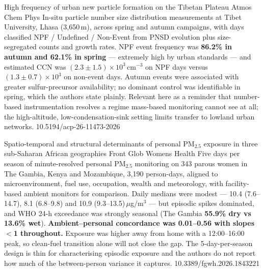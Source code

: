 \documentclass[10pt]{article}
\begin{document}
{High frequency of urban new particle formation on the Tibetan Plateau}
{Atmos Chem Phys}
{In-situ particle number size distribution measurements at Tibet University, Lhasa
(3{,}650\,m), across spring and autumn campaigns, with days classified NPF / Undefined /
Non-Event from PNSD evolution plus size-segregated counts and growth rates. NPF event
frequency was \textbf{86.2\% in autumn and 62.1\% in spring} --- extremely high by urban
standards --- and estimated CCN was $(2.3\pm1.5)\times10^3$\,cm$^{-3}$ on NPF days versus
$(1.3\pm0.7)\times10^3$ on non-event days. Autumn events were associated with greater
sulfur-precursor availability; no dominant control was identifiable in spring, which the
authors state plainly. Relevant here as a reminder that number-based instrumentation
resolves a regime mass-based monitoring cannot see at all; the high-altitude,
low-condensation-sink setting limits transfer to lowland urban networks.}
{10.5194/acp-26-11473-2026}


{Spatio-temporal and structural determinants of personal PM$_{2.5}$ exposure in three sub-Saharan African geographies}
{Front Glob Womens Health}
{Five days per season of minute-resolved personal PM$_{2.5}$ monitoring on 343 parous
women in The Gambia, Kenya and Mozambique, 3{,}190 person-days, aligned to
microenvironment, fuel use, occupation, wealth and meteorology, with facility-based
ambient monitors for comparison. Daily medians were modest --- 10.4 (7.6--14.7),
8.1 (6.8--9.8) and 10.9 (9.3--13.5)\,$\mu$g/m$^3$ --- but episodic spikes dominated, and
WHO 24-h exceedance was strongly seasonal (The Gambia \textbf{55.9\% dry vs 13.6\% wet}).
\textbf{Ambient--personal concordance was 0.01--0.56 with slopes $<$1 throughout.}
Exposure was higher away from home with a 12:00--16:00 peak, so clean-fuel transition
alone will not close the gap. The 5-day-per-season design is thin for characterising
episodic exposure and the authors do not report how much of the between-person variance
it captures.}
{10.3389/fgwh.2026.1843221}

\end{document}
